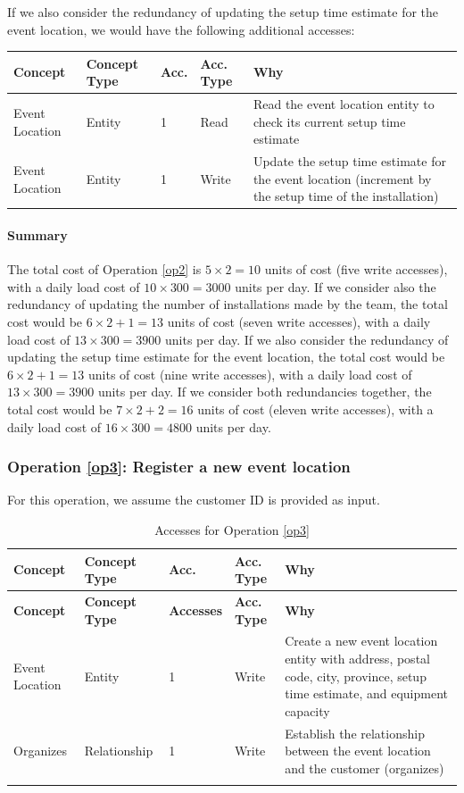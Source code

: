 If we also consider the redundancy of updating the setup time estimate for the event location, we would have the following additional accesses:

\begin{longtable}[H]{|p{2cm}|p{2cm}|p{1cm}|p{1cm}|p{7cm}|}
    \hline
    \textbf{Concept} & \textbf{Concept Type} & \textbf{Acc.} & \textbf{Acc. Type} & \textbf{Why} \\
    \hline
    Event Location & Entity & 1 & Read & Read the event location entity to check its current setup time estimate \\
    \hline
    Event Location & Entity & 1 & Write & Update the setup time estimate for the event location (increment by the setup time of the installation) \\
    \hline
\end{longtable}

\paragraph{Summary}
The total cost of Operation \ref{op2} is $5 \times 2 = 10$ units of cost (five write accesses), with a daily load cost of $10 \times 300 = 3000$ units per day. If we consider also the redundancy of updating the number of installations made by the team, the total cost would be $6 \times 2 + 1 = 13$ units of cost (seven write accesses), with a daily load cost of $13 \times 300 = 3900$ units per day. If we also consider the redundancy of updating the setup time estimate for the event location, the total cost would be $6 \times 2 + 1 = 13$ units of cost (nine write accesses), with a daily load cost of $13 \times 300 = 3900$ units per day. If we consider both redundancies together, the total cost would be $7 \times 2 + 2 = 16$ units of cost (eleven write accesses), with a daily load cost of $16 \times 300 = 4800$ units per day.

\subsubsection{Operation \ref{op3}: Register a new event location}

For this operation, we assume the customer ID is provided as input.

\begin{longtable}[H]{|p{2cm}|p{2cm}|p{2cm}|p{2cm}|p{7cm}|}
    \hline
    \textbf{Concept} & \textbf{Concept Type} & \textbf{Acc.} & \textbf{Acc. Type} & \textbf{Why} \\
    \hline
    \endfirsthead
    \hline
    \textbf{Concept} & \textbf{Concept Type} & \textbf{Accesses} & \textbf{Acc. Type} & \textbf{Why} \\
    \hline
    \endhead
    Event Location & Entity & 1 & Write & Create a new event location entity with address, postal code, city, province, setup time estimate, and equipment capacity \\
    \hline
    Organizes & Relationship & 1 & Write & Establish the relationship between the event location and the customer (organizes) \\
    \hline
    \caption{Accesses for Operation \ref{op3}}
    \label{tab:op3-accesses-logical}
\end{longtable}

